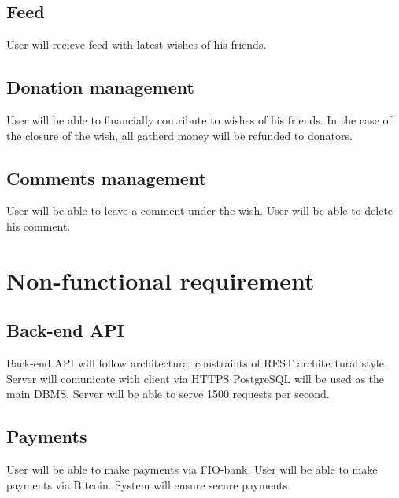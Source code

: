 \subsection{Feed}
User will recieve feed with latest wishes of his friends.

\subsection{Donation management}
User will be able to financially contribute to wishes of his friends.
In the case of the closure of the wish, all gatherd money will be refunded to donators.

\subsection{Comments management}
User will be able to leave a comment under the wish.
User will be able to delete his comment.

\section{Non-functional requirement}

\subsection{Back-end API}
Back-end API will follow architectural constraints of REST architectural style.
Server will comunicate with client via HTTPS
PostgreSQL will be used as the main DBMS.
Server will be able to serve 1500 requests per second.

\subsection{Payments}
User will be able to make payments via FIO-bank.
User will be able to make payments via Bitcoin.
System will ensure secure payments.
